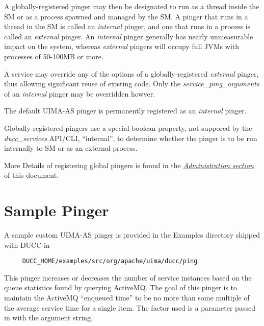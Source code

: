     A globally-registered pinger may then be designated to run as a thread inside the SM or as a
    process spawned and managed by the SM. A pinger that runs in a thread in the SM is
    called an {\em internal} pinger, and one that runs in a process is called an {\em external}
    pinger.  An {\em internal} pinger generally has nearly unmeasurable impact on the system,
    whereas {\em external} pingers will occupy full JVMs with processes of 50-100MB or more.
    
    A service may override any of the options of a globally-registered {\em external} pinger,
    thus allowing significant reuse of existing code.  Only the {\em service\_ping\_arguments} 
    of an {\em internal} pinger may be overridden howver.

    The default UIMA-AS pinger is permanently registered as an {\em internal} pinger.

    Globally registered pingers use a special boolean property, not suppored by the
    {\em ducc\_services} API/CLI, ``internal'', to determine whether the pinger is
    to be run internally to SM or as an external process.

    More Details of registering global pingers is found in the 
    \hyperref[chap:sm]{\em Administration section} of this document.

\section{Sample Pinger}
    
    A sample custom UIMA-AS pinger is provided in the Examples directory shipped 
    with DUCC in
\begin{verbatim}
     DUCC_HOME/examples/src/org/apache/uima/ducc/ping
\end{verbatim}
    
    This pinger increases or decreases the number of service instances based
    on the queue statistics found by querying ActiveMQ.  The goal of this
    pinger is to maintain the ActiveMQ ``enqueued time'' to be no more than
    some multiple of the average service time for a single item.  The factor
    used is a parameter passed in with the argument string.

